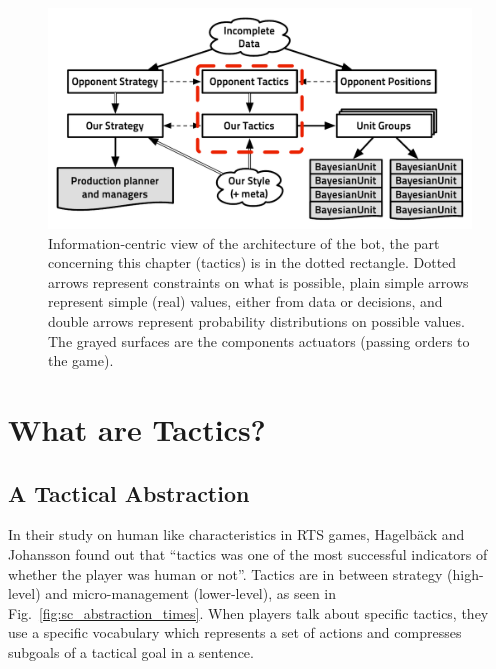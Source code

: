 \begin{figure}[!ht]
\begin{center}
\includegraphics[width=13cm]{images/starcraft_bbq_concept_TACTICS.pdf}
\end{center}
\label{fig:conceptTACTICS}
\caption{Information-centric view of the architecture of the bot, the part concerning this chapter (tactics) is in the dotted rectangle. Dotted arrows represent constraints on what is possible, plain simple arrows represent simple (real) values, either from data or decisions, and double arrows represent probability distributions on possible values. The grayed surfaces are the components actuators (passing orders to the game).}
\end{figure}

\section{What are Tactics?}
\subsection{A Tactical Abstraction}
In their study on human like characteristics in RTS games, Hagelb\"{a}ck and Johansson \cite{HagelbackCIG10} found out that ``tactics was one of the most successful indicators of whether the player was human or not''. Tactics are in between strategy (high-level) and micro-management (lower-level), as seen in Fig.~\ref{fig:sc_abstraction_times}. When players talk about specific tactics, they use a specific vocabulary which represents a set of actions and compresses subgoals of a tactical goal in a sentence. %

